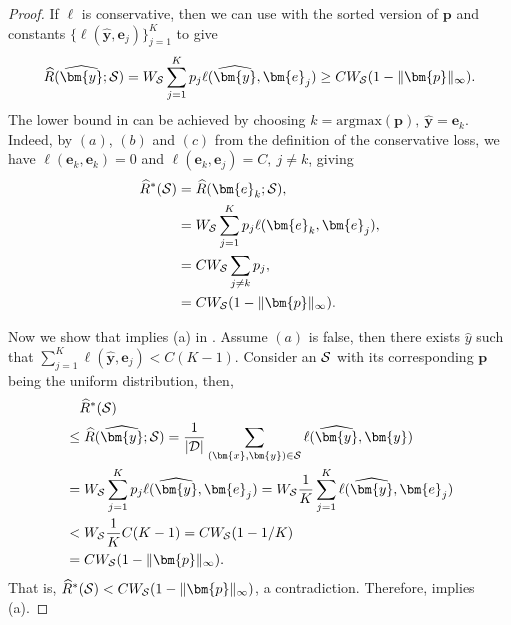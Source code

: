 \documentclass[letterpaper]{article} %
\newcommand{\bx}{{\bm{x}}}
\newcommand{\bp}{{\bm{p}}}
\newcommand{\by}{{\bm{y}}}
\newcommand{\be}{{\bm{e}}}
\newcommand{\cS}{{\cal{S}}}
\newcommand{\cD}{{\cal{D}}}
\newcommand{\WS}{{W_{\cal{S}}}}
\newcommand{\simplex}{\Delta}
\newcommand{\argmax}{\mathrm{argmax}}
\begin{document}
\universal*
\begin{proof}
    If $\ell$ is conservative, then we can use  with the sorted version of $\bp$ and constants $\{\ell(\widehat{\by},\be_j)\}_{j=1}^K$ to give
    \begin{align}
        \widehat{R}(\widehat{\by};\cS) = \WS\sum_{j=1}^K p_j\ell(\widehat{\by},\be_j) \geq C\WS (1-\|\bp\|_\infty).\label{eq:lb}
    \end{align}
    The lower bound in  can be achieved by choosing $k=\argmax(\bp),\ \widehat{\by}=\be_k$.
    Indeed, by $(a)$, $(b)$ and $(c)$ from the definition of the conservative loss, we have $\ell(\be_k,\be_k)=0$ and $\ell(\be_k,\be_j)=C,\ j\ne k$, giving
    \begin{align*}
        \widehat{R}^*(\cS)
        &= \widehat{R}(\be_{k};\cS),
        \\
        &=\WS\sum_{j=1}^K p_j\ell(\be_k,\be_j),
        \\
        &=C\WS\sum_{j\ne k} p_j,
        \\
        &=C\WS (1-\|\bp\|_\infty).
    \end{align*}

    Now we show that  implies (a) in .
    Assume $(a)$ is false, then there exists $\widehat{y}$ such that
    $\sum_{j=1}^K\ell(\widehat{\by},\be_j) < C(K-1)$.
    Consider an $\cS$ with its corresponding $\bp$ being the uniform distribution, then,
    \begin{align*}
        &\quad \widehat{R}^{*}(\cS) \\
        &\le \widehat{R}(\widehat{\by};\cS)
            = \frac{1}{|\cD|}\sum_{(\bx,\by)\in\cS} \ell(\widehat{\by},\by)\\
        &= \WS \sum_{j=1}^K p_j\ell(\widehat{\by},\be_j)
            = \WS\frac{1}{K}\sum_{j=1}^K \ell(\widehat{\by},\be_j) \\
        &< \WS\frac{1}{K}C(K-1)
            =  C\WS (1-1/K) \\
        &= C \WS (1-\|\bp\|_\infty).
    \end{align*}
    That is, $\widehat{R}^{*}(\cS) < C \WS (1-\|\bp\|_\infty)$, a contradiction.
    Therefore,  implies (a).
\end{proof}
\end{document}
